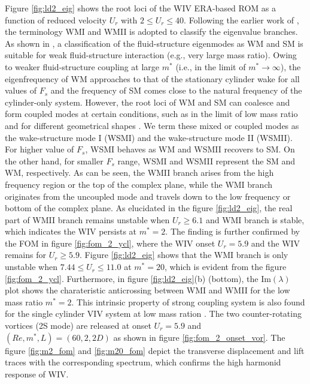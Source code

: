 Figure \ref{fig:ld2_eig} shows the root loci of the WIV ERA-based ROM as a function of reduced 
velocity $U_r$ with $2 \le U_r \le 40$. Following the earlier work of \cite{yao_jfm_1}, the terminology 
WMI and WMII is adopted to classify the eigenvalue branches. 
As shown in \cite{yao_jfm_1}, a classification of the fluid-structure eigenmodes as 
WM and SM is suitable for weak fluid-structure interaction 
(e.g., very large mass ratio). Owing to weaker fluid-structure coupling 
at large $m^*$ (i.e., in the limit of $m^* \to \infty$),  the eigenfrequency 
of WM approaches to that of the stationary cylinder wake for all values of $F_s$ and 
the frequency of SM comes close to the natural frequency of the cylinder-only system.
%
However, the root loci of WM and SM can coalesce   
and form coupled modes at certain conditions, such as in the limit of 
low mass ratio \cite{meliga2011,mittal2016} and for different geometrical shapes \cite{yao_jfm_1}.  
We term these mixed or coupled modes 
as the wake-structure mode I (WSMI) and the wake-structure mode II (WSMII).
%
For higher value of $F_s$,  WSMI behaves as WM and WSMII recovers to SM.
On the other hand, for smaller $F_s$ range, WSMI and WSMII  represent the SM and
WM, respectively.
As can be seen, 
the WMII branch arises from the high frequency region or the top
of the complex plane, while the WMI branch originates from the uncoupled mode and travels down to the low frequency 
or bottom of the complex plane. 
As elucidated in the figure \ref{fig:ld2_eig}, 
the real part of WMII branch remains unstable when $U_r \ge 6.1$ and WMI branch is stable, 
which indicates the WIV persists at $m^*=2$. The finding is further 
confirmed by the FOM in figure \ref{fig:fom_2_ycl}, where the WIV onset $U_r=5.9$ and the WIV remains for $U_r \ge 5.9$. 
%
Figure \ref{fig:ld2_eig} shows that the WMI branch is only unstable when $7.44 \le U_r \le 11.0$ at $m^*=20$, which is evident 
from the figure \ref{fig:fom_2_ycl}. 
Furthermore, in figure \ref{fig:ld2_eig}(b) (bottom), the Im$(\lambda)$ plot shows the charateristic anticrossing between WMI and WMII for 
the low mass ratio $m^*=2$. This intrinsic property of strong coupling system is also found for 
the single cylinder VIV system at low mass ration \cite{yao_jfm_1}. 
The two counter-rotating vortices (2S mode) are released at onset $U_r=5.9$ and $(Re,m^*,L)=(60,2,2D)$ 
as shown in figure \ref{fig:fom_2_onset_vor}. 
The figure \ref{fig:m2_fom} and \ref{fig:m20_fom} depict the transverse displacement and lift traces with the 
corresponding spectrum, which confirms the high harmonid response of WIV. 

